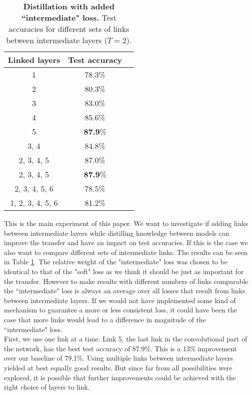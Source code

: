 \documentclass[10pt,twocolumn,letterpaper]{article}
\begin{document}
\begin{table}[]
	\begin{center}
	\begin{tabular}{|c|c|c|}
		\hline
		Linked layers		&	Test accuracy		\\ \hline
		1					&	78.3\%				\\ \hline
		2					&	80.3\%				\\ \hline
		3					&	83.0\%				\\ \hline
		4					&	85.6\%				\\ \hline
		5					&	\textbf{87.9}\%		\\ \hline
		3, 4				&	84.8\%				\\ \hline
		2, 3, 4, 5			&	87.0\%				\\ \hline
		2, 3, 4, 5			&	\textbf{87.9}\%		\\ \hline
		2, 3, 4, 5, 6		&	78.5\%				\\ \hline
		1, 2, 3, 4, 5, 6	&	81.2\%				\\ \hline
	\end{tabular}
	\end{center}
	\caption{\textbf{Distillation with added ``intermediate" loss.} Test accuracies for different sets of links between intermediate layers ($T=2$).}
	\label{tab:interemediate_results}
\end{table}
This is the main experiment of this paper. We want to investigate if adding links between intermediate layers while distilling knowledge between models can improve the transfer and have an impact on test accuracies. If this is the case we also want to compare different sets of intermediate links. The results can be seen in Table \ref{tab:interemediate_results}. The relative weight of the "intermediate" loss was chosen to be identical to that of the "soft" loss as we think it should be just as important for the transfer. However to make results with different numbers of links comparable the ``intermediate" loss is always an average over all losses that result from links between intermediate layers. If we would not have implemented some kind of mechanism to guarantee a more or less consistent loss, it could have been the case that more links would lead to a difference in magnitude of the ``intermediate" loss.\\
First, we use one link at a time. Link 5, the last link in the convolutional part of the network, has the best test accuracy of 87.9\%. This is a 13\% improvement over our baseline of 79.1\%. Using multiple links between intermediate layers yielded at best equally good results. But since far from all possibilities were explored, it is possible that further improvements could be achieved with the right choice of layers to link.
\end{document}
